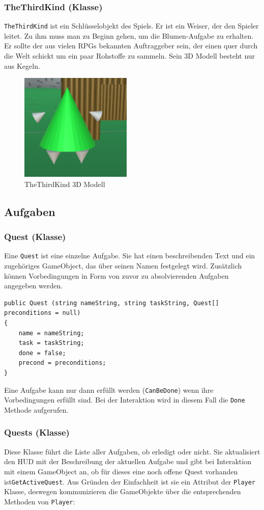 \subsubsection{TheThirdKind (Klasse)}
\lstinline{TheThirdKind} ist ein Schlüsselobjekt des Spiels. Er ist ein Weiser, der den Spieler leitet. Zu ihm muss man zu Beginn gehen, um die Blumen-Aufgabe zu erhalten.
Er sollte der aus vielen RPGs bekannten Auftraggeber sein, der einen quer durch die Welt schickt um ein paar Rohstoffe zu sammeln. Sein 3D Modell besteht nur aus Kegeln.
\begin{figure}[H]
\includegraphics[scale=1]{screenshots/t3k.png}
\caption{ TheThirdKind 3D Modell}
\end{figure}


\subsection{Aufgaben}

\subsubsection{Quest (Klasse)}
Eine \lstinline{Quest} ist eine einzelne Aufgabe. Sie hat einen beschreibenden Text und ein zugehöriges GameObject, das über seinen Namen festgelegt wird. Zusätzlich können Vorbedingungen in Form von zuvor zu absolvierenden Aufgaben angegeben werden.

\begin{lstlisting}
public Quest (string nameString, string taskString, Quest[] preconditions = null)
{
	name = nameString;
	task = taskString;
	done = false;
	precond = preconditions;
}
\end{lstlisting}

Eine Aufgabe kann nur dann erfüllt werden (\lstinline{CanBeDone}) wenn ihre Vorbedingungen erfüllt sind. Bei der Interaktion wird in diesem Fall die \lstinline{Done} Methode aufgerufen.

\subsubsection{Quests (Klasse)}
Diese Klasse führt die Liste aller Aufgaben, ob erledigt oder nicht. Sie  aktualisiert den HUD mit der Beschreibung der aktuellen Aufgabe und gibt bei Interaktion mit einem GameObject an, ob für dieses eine noch offene Quest vorhanden ist\lstinline{GetActiveQuest}. Aus Gründen der Einfachheit ist sie ein Attribut der \lstinline{Player} Klasse, deswegen kommunizieren die GameObjekte über die entsprechenden Methoden von \lstinline{Player}:


